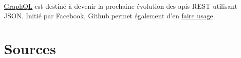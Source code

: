 \href{http://graphql.org/}{GraphQL} est destiné à devenir la prochaine
évolution des apis REST utilisant JSON. Initié par Facebook, Github
permet également d'en
\href{https://developer.github.com/early-access/graphql/}{faire usage}.

\begin{otherlanguage}{english}

\end{otherlanguage}

\begin{otherlanguage}{english}

\end{otherlanguage}

\begin{otherlanguage}{english}

\end{otherlanguage}

\hypertarget{sources}{%
\section{Sources}\label{sources}}

